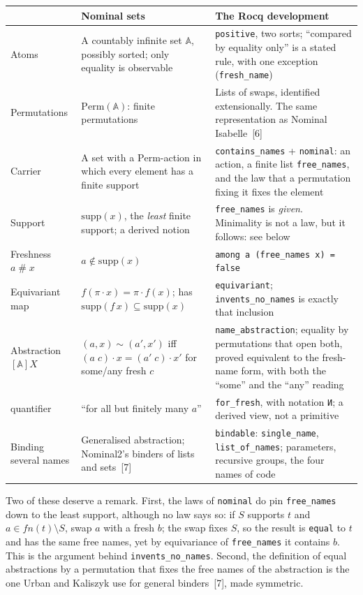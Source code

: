 \documentclass[10pt,a4paper]{article}
\newcommand\code[1]{\texttt{#1}}
\begin{document}
{\small
\renewcommand\arraystretch{1.35}
\begin{tabularx}{\linewidth}{@{}>{\raggedright\arraybackslash}p{3.3cm}>{\raggedright\arraybackslash}X>{\raggedright\arraybackslash}X@{}}
\toprule
& \textbf{Nominal sets} & \textbf{The Rocq development} \\
\midrule
Atoms & A countably infinite set $\mathbb{A}$, possibly sorted; only equality
  is observable & \code{positive}, two sorts; ``compared by equality only'' is a
  stated rule, with one exception (\code{fresh\_name}) \\
Permutations & $\mathrm{Perm}(\mathbb{A})$: finite permutations & Lists of
  swaps, identified extensionally. The same representation as Nominal
  Isabelle~[6] \\
Carrier & A set with a $\mathrm{Perm}$-action in which every element has a
  finite support & \code{contains\_names} + \code{nominal}: an action, a
  finite list \code{free\_names}, and the law that a permutation fixing it
  fixes the element \\
Support & $\mathrm{supp}(x)$, the \emph{least} finite support; a derived
  notion & \code{free\_names} is \emph{given}. Minimality is not a law, but it
  follows: see below \\
Freshness $a \mathrel{\#} x$ & $a \notin \mathrm{supp}(x)$ &
  \code{among a (free\_names x) = false} \\
Equivariant map & $f(\pi\cdot x) = \pi\cdot f(x)$; has
  $\mathrm{supp}(f\,x)\subseteq\mathrm{supp}(x)$ & \code{equivariant};
  \code{invents\_no\_names} is exactly that inclusion \\
Abstraction $[\mathbb{A}]X$ & $(a,x)\sim(a',x')$ iff
  $(a\;c)\cdot x = (a'\;c)\cdot x'$ for some/any fresh $c$ &
  \code{name\_abstraction}; equality by permutations that open both, proved
  equivalent to the fresh-name form, with both the ``some'' and the ``any''
  reading \\
{N} quantifier & ``for all but finitely many $a$'' & \code{for\_fresh},
  with notation \code{И}; a derived view, not a primitive \\
Binding several names & Generalised abstraction; Nominal2's binders of lists
  and sets~[7] & \code{bindable}: \code{single\_name}, \code{list\_of\_names};
  parameters, recursive groups, the four names of code \\
\bottomrule
\end{tabularx}}

Two of these deserve a remark. First, the laws of \code{nominal} do pin
\code{free\_names} down to the least support, although no law says so: if $S$
supports $t$ and $a \in \mathit{fn}(t)\setminus S$, swap $a$ with a fresh
$b$; the swap fixes $S$, so the result is \code{equal} to $t$ and has the same
free names, yet by equivariance of \code{free\_names} it contains $b$. This is
the argument behind \code{invents\_no\_names}. Second, the definition of equal
abstractions by a permutation that fixes the free names of the abstraction is
the one Urban and Kaliszyk use for general binders~[7], made symmetric.
\end{document}
